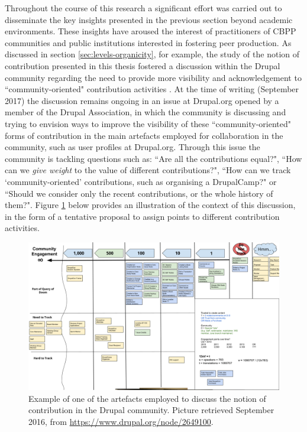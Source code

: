 Throughout the course of this research a significant effort was carried out to disseminate the key insights presented in the previous section beyond academic environments. These insights have aroused the interest of practitioners of CBPP communities and public institutions interested in fostering peer production. As discussed in section \ref{sec:levels-organicity}, for example, the study of the notion of contribution presented in this thesis fostered a discussion within the Drupal community regarding the need to provide more visibility and acknowledgement to ``community-oriented"  contribution activities \parencite[e.g.][]{impact-contrib01:Online, impact-contrib02:Online, impact-contrib03:Online, impact-contrib04:Online, impact-contrib05:Online, impact-contrib06:Online, impact-contrib07:Online, impact-contrib08:Online, impact-contrib10:Online}. At the time of writing (September 2017) the discussion remains ongoing in an issue \parencite{impact-contrib10:Online} at Drupal.org opened by a member of the Drupal Association, in which the community is discussing and trying to envision ways to improve the visibility of these ``community-oriented" forms of contribution in the main artefacts employed for collaboration in the community, such as user profiles at Drupal.org. Through this issue the community is tackling questions such as: ``Are all the contributions equal?", ``How can we \textit{give weight} to the value of different contributions?", ``How can we track `community-oriented' contributions, such as organising a DrupalCamp?" or ``Should we consider only the recent contributions, or the whole history of them?". Figure \ref{user-contribs} below provides an illustration of the context of this discussion, in the form of a tentative proposal to assign points to different contribution activities.

\begin{figure}[H]
    \centering
\includegraphics[width=\textwidth]{img/polycentric/contrib-cc.png}
    \caption[Artefact employed to discuss the notion of contribution in the Drupal community]%
    {Example of one of the artefacts employed to discuss the notion of contribution in the Drupal community. Picture retrieved  September 2016, from \url{https://www.drupal.org/node/2649100}.}
    \label{user-contribs}
\end{figure}

